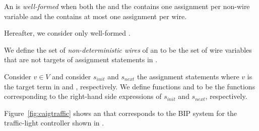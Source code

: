 \begin{definition}
An \caig is {\em well-formed} when both 
the  and the 
contains one assignment per non-wire variable and
the  contains at most 
one assignment per wire. 
\end{definition}
%
Hereafter, we consider only well-formed \caig.


\begin{definition}
We define the set of {\em non-deterministic wires} of 
an \caig to be the set of wire variables that are not 
targets of assignment statements in .
\end{definition}



\begin{definition}
Consider $v\in V$ and consider $s_{init}$ and $s_{next}$ 
the assignment statements where $v$ is the target term in 
 and , respectively. 
We define functions  and  
to be the functions corresponding to the right-hand side 
expressions of $s_{init}$ and $s_{next}$, respectively. 
\end{definition}

\begin{example}
Figure~\ref{fig:caigtraffic} shows an \caig that corresponds to the BIP system for the traffic-light controller shown in . 

\end{example}

